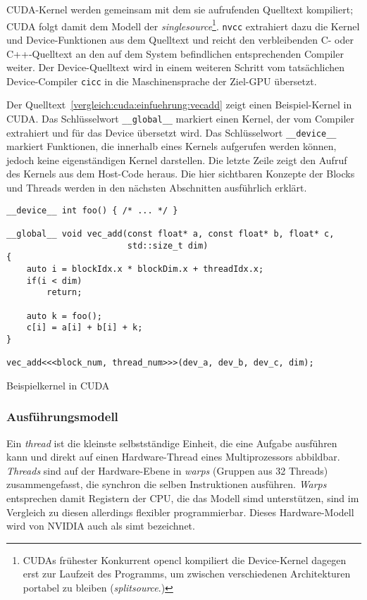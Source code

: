 CUDA-Kernel werden gemeinsam mit dem sie aufrufenden Quelltext kompiliert; CUDA
folgt damit dem Modell der \textit{\gls{singlesource}}\footnote{CUDAs frühester
Konkurrent \gls{opencl} kompiliert die Device-Kernel dagegen erst zur Laufzeit
des Programms, um zwischen verschiedenen Architekturen portabel zu bleiben
(\textit{\gls{splitsource}}.)}. \texttt{nvcc} extrahiert dazu die Kernel und
Device-Funktionen aus dem Quelltext und reicht den verbleibenden C- oder
C++-Quelltext an den auf dem System befindlichen entsprechenden Compiler
weiter. Der Device-Quelltext wird in einem weiteren Schritt vom tatsächlichen
Device-Compiler \texttt{cicc} in die Maschinensprache der Ziel-GPU übersetzt.

Der Quelltext~\ref{vergleich:cuda:einfuehrung:vecadd} zeigt einen
Beispiel-Kernel in CUDA. Das Schlüsselwort \texttt{\_\_global\_\_} markiert
einen Kernel, der vom Compiler extrahiert und für das Device übersetzt wird. Das
Schlüsselwort \texttt{\_\_device\_\_} markiert Funktionen, die innerhalb eines
Kernels aufgerufen werden können, jedoch keine eigenständigen Kernel darstellen.
Die letzte Zeile zeigt den Aufruf des Kernels aus dem Host-Code heraus. Die hier
sichtbaren Konzepte der Blocks und Threads werden in den nächsten Abschnitten
ausführlich erklärt.

\begin{code}
    \begin{verbatim}
__device__ int foo() { /* ... */ }

__global__ void vec_add(const float* a, const float* b, float* c,
                        std::size_t dim)
{
    auto i = blockIdx.x * blockDim.x + threadIdx.x;
    if(i < dim)
        return;

    auto k = foo();
    c[i] = a[i] + b[i] + k;
}

vec_add<<<block_num, thread_num>>>(dev_a, dev_b, dev_c, dim);
    \end{verbatim}
    \caption{Beispielkernel in CUDA}
    \label{vergleich:cuda:einfuehrung:vecadd}
\end{code}


\subsubsection{Ausführungsmodell}

Ein \textit{thread} ist die kleinste selbstständige Einheit, die eine Aufgabe
ausführen kann und direkt auf einen Hardware-Thread eines Multiprozessors
abbildbar. \textit{Threads} sind auf der Hardware-Ebene in \textit{warps}
(Gruppen aus 32 Threads) zusammengefasst, die synchron die selben Instruktionen
ausführen. \textit{Warps} entsprechen damit Registern der CPU, die das Modell
\gls{simd} unterstützen, sind im Vergleich zu diesen allerdings flexibler
programmierbar. Dieses Hardware-Modell wird von NVIDIA auch als \gls{simt}
bezeichnet.

